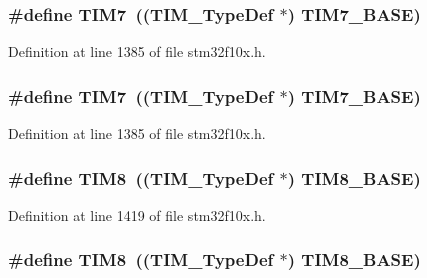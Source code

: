 \subsubsection[{\texorpdfstring{T\+I\+M7}{TIM7}}]{\setlength{\rightskip}{0pt plus 5cm}\#define T\+I\+M7~(({\bf T\+I\+M\+\_\+\+Type\+Def} $\ast$) {\bf T\+I\+M7\+\_\+\+B\+A\+SE})}\hypertarget{group___peripheral__declaration_ga49267c49946fd61db6af8b49bcf16394}{}\label{group___peripheral__declaration_ga49267c49946fd61db6af8b49bcf16394}


Definition at line 1385 of file stm32f10x.\+h.

\subsubsection[{\texorpdfstring{T\+I\+M7}{TIM7}}]{\setlength{\rightskip}{0pt plus 5cm}\#define T\+I\+M7~(({\bf T\+I\+M\+\_\+\+Type\+Def} $\ast$) {\bf T\+I\+M7\+\_\+\+B\+A\+SE})}\hypertarget{group___peripheral__declaration_ga49267c49946fd61db6af8b49bcf16394}{}\label{group___peripheral__declaration_ga49267c49946fd61db6af8b49bcf16394}


Definition at line 1385 of file stm32f10x.\+h.

\subsubsection[{\texorpdfstring{T\+I\+M8}{TIM8}}]{\setlength{\rightskip}{0pt plus 5cm}\#define T\+I\+M8~(({\bf T\+I\+M\+\_\+\+Type\+Def} $\ast$) {\bf T\+I\+M8\+\_\+\+B\+A\+SE})}\hypertarget{group___peripheral__declaration_ga9a3660400b17735e91331f256095810e}{}\label{group___peripheral__declaration_ga9a3660400b17735e91331f256095810e}


Definition at line 1419 of file stm32f10x.\+h.

\subsubsection[{\texorpdfstring{T\+I\+M8}{TIM8}}]{\setlength{\rightskip}{0pt plus 5cm}\#define T\+I\+M8~(({\bf T\+I\+M\+\_\+\+Type\+Def} $\ast$) {\bf T\+I\+M8\+\_\+\+B\+A\+SE})}\hypertarget{group___peripheral__declaration_ga9a3660400b17735e91331f256095810e}{}\label{group___peripheral__declaration_ga9a3660400b17735e91331f256095810e}


